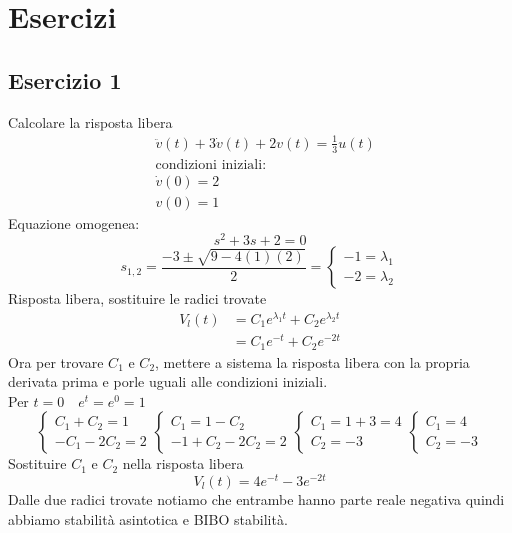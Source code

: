 
%
	\section{Esercizi}
	
	\subsection{Esercizio 1}
	Calcolare la risposta libera
		\[
		\begin{split}
		&\ddot{v}(t) + 3\dot{v}(t)+2v(t) = \frac{1}{3}u(t)\\
		&\mathrm{condizioni \,\, iniziali:}\\
		&\dot{v}(0)=2\\
		&v(0)=1
		\end{split}		
		\]
		Equazione omogenea:
		\[s^2 + 3s + 2 = 0\]
		\[s_{1,2} = \frac{-3\pm\sqrt{9-4(1)(2)}}{2} =
		\begin{cases}
		-1 = \lambda_1\\
		-2 = \lambda_2
		\end{cases}
		\]
		Risposta libera, sostituire le radici trovate
		\[
		\begin{split}
		V_l(t)&=C_1e^{\lambda_1t} + C_2e^{\lambda_2t}\\
		&=C_1e^{-t}+C_2e^{-2t}
		\end{split}
		\]
		Ora per trovare $C_1$ e $C_2$, mettere a sistema la risposta libera con la propria derivata prima e porle uguali alle condizioni iniziali.\\
		Per $t=0 \quad e^t = e^0 = 1$
		\[
		\begin{cases}
		C_1+C_2= 1\\
		-C_1-2C_2=2 
		\end{cases}
		\begin{cases}
		C_1 = 1-C_2\\
		-1+C_2-2C_2 = 2
		\end{cases}
		\begin{cases}
		C_1 = 1+3 = 4\\
		C_2 = -3
		\end{cases}
		\begin{cases}
		C_1=4\\
		C_2 =-3
		\end{cases}
		\]
		Sostituire $C_1$ e $C_2$ nella risposta libera
		\[V_l(t) = 4e^{-t}-3e^{-2t}\]
		Dalle due radici trovate notiamo che entrambe hanno parte reale negativa quindi abbiamo stabilità asintotica e BIBO stabilità.
		\newpage
